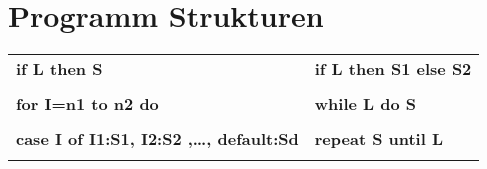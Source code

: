 \section{Programm Strukturen}
\begin{longtable}{p{9cm}p{9cm}}
	\hline
	\textbf{if L then S} & \textbf{if L then S1 else S2} \\
  	&  \\
	\hline
	\textbf{for I=n1 to n2 do} & \textbf{while L do S} \\
  	 & \\
	\hline
	\textbf{case I of I1:S1, I2:S2 ,\ldots , default:Sd} & \textbf{repeat S until L} \\
  	 &  \\
	\hline
\end{longtable}
